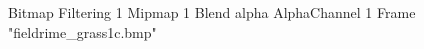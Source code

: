 {Bitmap
	{Filtering 1}
	{Mipmap 1}
	{Blend alpha}
	{AlphaChannel 1}
	{Frame "fieldrime_grass1c.bmp"}
}
